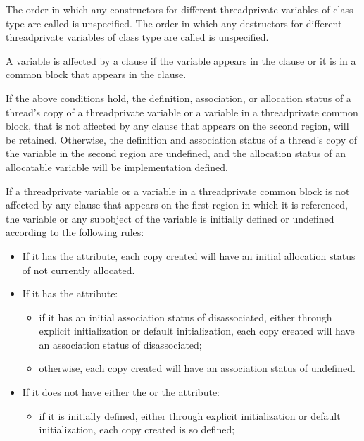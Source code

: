 {{{{\cppspecificstart
The order in which any constructors for different threadprivate variables of class type 
are called is unspecified. The order in which any destructors for different threadprivate 
variables of class type are called is unspecified. 
\cppspecificend

\fortranspecificstart
A variable is affected by a  clause if the variable appears in the  clause 
or it is in a common block that appears in the  clause. 

If the above conditions hold, the definition, association, or allocation status of a thread’s 
copy of a threadprivate variable or a variable in a threadprivate common 
block, that is not affected by any  clause that appears on the second region, will 
be retained. Otherwise, the definition and association status of a thread’s copy of the 
variable in the second region are undefined, and the allocation status of an allocatable 
variable will be implementation defined. 

If a threadprivate variable or a variable in a threadprivate common block is 
not affected by any  clause that appears on the first  region in which 
it is referenced, the variable or any subobject of the variable is initially defined or 
undefined according to the following rules:

\begin{itemize} %
\item If it has the  attribute, each copy created will have an initial 
allocation status of not currently allocated.

\item If it has the  attribute:
\begin{itemize} %
\item if it has an initial association status of disassociated, either through explicit 
initialization or default initialization, each copy created will have an association 
status of disassociated;
\item otherwise, each copy created will have an association status of undefined.
\end{itemize} %

\item If it does not have either the  or the  attribute:

\begin{samepage}\begin{itemize} %
\item if it is initially defined, either through explicit initialization or default 
initialization, each copy created is so defined;


\end{itemize}
\end{samepage}
\end{itemize}}}}}
